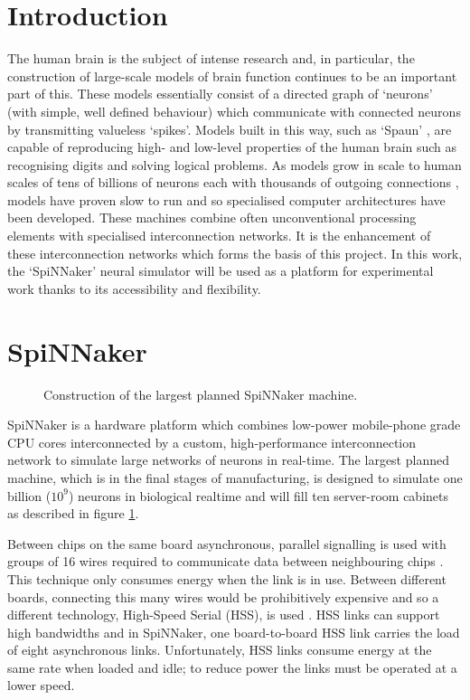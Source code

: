 \section{Introduction}

The human brain is the subject of intense research and, in particular, the
construction of large-scale models of brain function continues to be an
important part of this. These models essentially consist of a directed graph of
`neurons' (with simple, well defined behaviour) which communicate with connected
neurons by transmitting valueless `spikes'. Models built in this way, such as
`Spaun' \cite{eliasmith12}, are capable of reproducing high- and low-level
properties of the human brain such as recognising digits and solving logical
problems. As models grow in scale to human scales of tens of billions of neurons
\cite{williams88} each with thousands of outgoing connections \cite{kung88},
models have proven slow to run and so specialised computer architectures have
been developed. These machines combine often unconventional processing elements
with specialised interconnection networks. It is the enhancement of these
interconnection networks which forms the basis of this project. In this work,
the `SpiNNaker' \cite{furber07} neural simulator will be used as a platform for
experimental work thanks to its accessibility and flexibility.


\section{SpiNNaker}
	
	\begin{figure}
		\center
		
		
		\caption{Construction of the largest planned SpiNNaker machine.}
		\label{fig:spinnaker-abstractions}
	\end{figure}
	
	SpiNNaker is a hardware platform which combines low-power mobile-phone grade
	CPU cores interconnected by a custom, high-performance interconnection network
	to simulate large networks of neurons in real-time. The largest planned
	machine, which is in the final stages of manufacturing, is designed to
	simulate one billion ($10^9$) neurons in biological realtime
	\cite{navaridas09} and will fill ten server-room cabinets as described in
	figure \ref{fig:spinnaker-abstractions}.
	
	Between chips on the same board asynchronous, parallel signalling is used with
	groups of 16 wires required to communicate data between neighbouring chips
	\cite{bainbridge02}. This technique only consumes energy when the link is in
	use. Between different boards, connecting this many wires would be
	prohibitively expensive and so a different technology, High-Speed Serial
	(HSS), is used \cite{athavale05}. HSS links can support high bandwidths and in
	SpiNNaker, one board-to-board HSS link carries the load of eight asynchronous
	links.  Unfortunately, HSS links consume energy at the same rate when loaded
	and idle; to reduce power the links must be operated at a lower speed.
	
